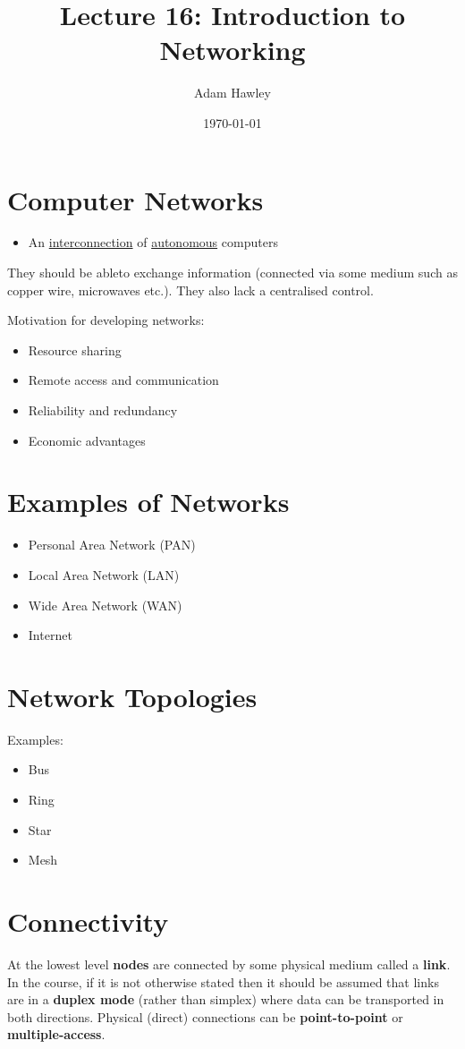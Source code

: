 \documentclass[11pt]{article}
\author{Adam Hawley}
\date{\today}
\title{Lecture 16: Introduction to Networking}
\begin{document}
\maketitle
\tableofcontents


\section{Computer Networks}
\label{sec:orgdef3cb1}
\begin{itemize}
\item An \uline{interconnection} of \uline{autonomous} computers
\end{itemize}
They should be ableto exchange information (connected via some medium such as copper wire, microwaves etc.).
They also lack a centralised control.

Motivation for developing networks:
\begin{itemize}
\item Resource sharing
\item Remote access and communication
\item Reliability and redundancy
\item Economic advantages
\end{itemize}

\section{Examples of Networks}
\label{sec:org0270caa}
\begin{itemize}
\item Personal Area Network (PAN)
\item Local Area Network (LAN)
\item Wide Area Network (WAN)
\item Internet
\end{itemize}

\section{Network Topologies}
\label{sec:org443b66f}
Examples:
\begin{itemize}
\item Bus
\item Ring
\item Star
\item Mesh
\end{itemize}

\section{Connectivity}
\label{sec:orgbb7b840}
At the lowest level \textbf{nodes} are connected by some physical medium called a \textbf{link}.
In the course, if it is not otherwise stated then it should be assumed that links are in a \textbf{duplex mode} (rather than simplex) where data can be transported in both directions.
Physical (direct) connections can be \textbf{point-to-point} or \textbf{multiple-access}.
\end{document}
